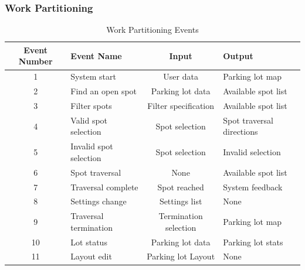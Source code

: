 \documentclass[12pt,letterpaper]{article}
\begin{document}
\newpage
\clearpage
\subsubsection{Work Partitioning}
\begin{table}[h!]
\caption{Work Partitioning Events}
    \centering
    \begin{tabular}{|c|p{3.5cm}|c|p{3.5cm}|}
    \hline
    \textbf{Event Number} & \centering\textbf{Event Name} & \textbf{Input} &
    \textbf{Output} \\
    \hline
    1 & System start & User data & Parking lot map\\
    \hline
    2 & Find an open spot & Parking lot data & Available spot list\\
    \hline
    3 & Filter spots & Filter specification & Available spot list\\
    \hline
    4 & Valid spot selection & Spot selection & Spot traversal directions\\
    \hline
    5 & Invalid spot selection & Spot selection & Invalid selection\\
    \hline
    6 & Spot traversal & None & Available spot list\\
    \hline
    7 & Traversal complete & Spot reached & System feedback\\
    \hline
    8 & Settings change & Settings list & None\\
    \hline
    9 & Traversal termination & Termination selection & Parking lot map\\
    \hline
    10 & Lot status & Parking lot data & Parking lot stats\\
    \hline
    11 & Layout edit & Parking lot Layout & None\\
    \hline
    \end{tabular}
\end{table}
\end{document}
